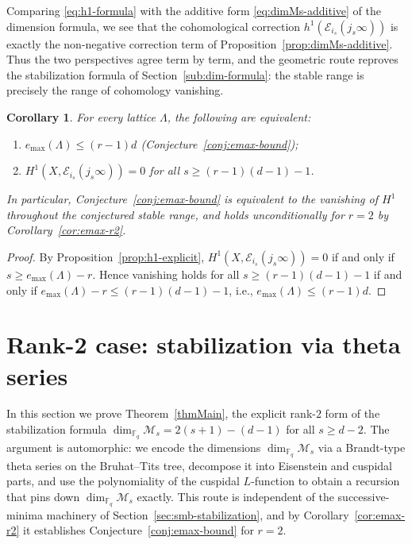 \documentclass[12pt]{amsart}
\newtheorem{cor}[thm]{Corollary}
\theoremstyle{definition}
\theoremstyle{remark}
\numberwithin{equation}{section}
\numberwithin{thm}{section}
\newcommand{\cE}{\mathcal{E}}
\newcommand{\cM}{\mathcal{M}}
\newcommand{\F}{\mathbb{F}}
\newcommand{\La}{\Lambda}
\begin{document}
	Comparing \eqref{eq:h1-formula} with the additive form \eqref{eq:dimMs-additive} of the dimension formula, we see that the cohomological correction $h^1(\cE_{i_s}(j_s\infty))$ is exactly the non-negative correction term of Proposition~\ref{prop:dimMs-additive}. Thus the two perspectives agree term by term, and the geometric route reproves the stabilization formula of Section~\ref{sub:dim-formula}: the stable range is precisely the range of cohomology vanishing.
	
	\begin{cor}\label{cor:cohom-vanishing}
		For every lattice $\La$, the following are equivalent:
		\begin{enumerate}
			\item[\textup{(1)}] $e_{\max}(\La) \leq (r-1)d$ \textup{(}Conjecture~\ref{conj:emax-bound}\textup{)};
			\item[\textup{(2)}] $H^1(X, \cE_{i_s}(j_s\infty)) = 0$ for all $s \geq (r-1)(d-1) - 1$.
		\end{enumerate}
		In particular, Conjecture~\ref{conj:emax-bound} is equivalent to the vanishing of $H^1$ throughout the conjectured stable range, and holds unconditionally for $r = 2$ by Corollary~\ref{cor:emax-r2}.
	\end{cor}
	
	\begin{proof}
		By Proposition~\ref{prop:h1-explicit}, $H^1(X, \cE_{i_s}(j_s\infty)) = 0$ if and only if $s \geq e_{\max}(\La) - r$. Hence vanishing holds for all $s \geq (r-1)(d-1) - 1$ if and only if $e_{\max}(\La) - r \leq (r-1)(d-1) - 1$, i.e., $e_{\max}(\La) \leq (r-1)d$.
	\end{proof}
	
	
	
	\section{Rank-2 case: stabilization via theta series}\label{secBrandt}
	
	In this section we prove Theorem~\ref{thmMain}, the explicit rank-$2$ form of the stabilization formula $\dim_{\F_q}\cM_s = 2(s+1)-(d-1)$ for all $s\geq d-2$. The argument is automorphic: we encode the dimensions $\dim_{\F_q}\cM_s$ via a Brandt-type theta series on the Bruhat--Tits tree, decompose it into Eisenstein and cuspidal parts, and use the polynomiality of the cuspidal $L$-function to obtain a recursion that pins down $\dim_{\F_q}\cM_s$ exactly. This route is independent of the successive-minima machinery of Section~\ref{sec:smb-stabilization}, and by Corollary~\ref{cor:emax-r2} it establishes Conjecture~\ref{conj:emax-bound} for $r=2$.
	
\end{document}
